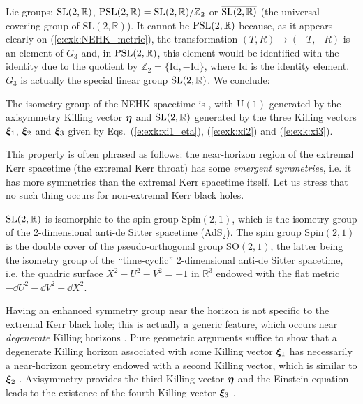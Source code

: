 Lie groups: $\mathrm{SL}(2,\mathbb{R})$, $\mathrm{PSL}(2,\mathbb{R}) = \mathrm{SL}(2,\mathbb{R})/\mathbb{Z}_2$
or $\overline{\mathrm{SL}(2,\mathbb{R})}$
(the universal covering group of $\mathrm{SL}(2, \mathbb{R})$).
It cannot be $\mathrm{PSL}(2,\mathbb{R})$ because, as it appears clearly on (\ref{e:exk:NEHK_metric}),
the transformation $(T,R) \mapsto (-T,-R)$ is an element of $G_3$ and, in $\mathrm{PSL}(2,\mathbb{R})$, this element would be identified with the identity
due to the quotient by $\mathbb{Z}_2 = \{\mathrm{Id}, -\mathrm{Id}\}$, where $\mathrm{Id}$
is the identity element.
$G_3$ is actually the
special linear group $\mathrm{SL}(2,\mathbb{R})$. We conclude:
\begin{prop}
The isometry group
of the NEHK spacetime is
\be \label{e:exk:NHEK_isometry_group}
     ,
\ee
with $\mathrm{U}(1)$ generated by the axisymmetry Killing vector $\bm{\eta}$ and
$\mathrm{SL}(2,\mathbb{R})$ generated by the three Killing vectors $\bm{\xi}_1$, $\bm{\xi}_2$ and
$\bm{\xi}_3$ given by Eqs.~(\ref{e:exk:xi1_eta}), (\ref{e:exk:xi2}) and (\ref{e:exk:xi3}).
\end{prop}

This property is often phrased as follows: the near-horizon region of the extremal
Kerr spacetime (the extremal Kerr throat) has some \emph{emergent symmetries}, i.e. it has
more symmetries than the extremal Kerr spacetime itself.
Let us stress that no such thing occurs for non-extremal Kerr black holes.

\begin{remark}
$\mathrm{SL}(2,\mathbb{R})$ is isomorphic to the spin group $\mathrm{Spin}(2,1)$,
which is the isometry group of the 2-dimensional anti-de Sitter spacetime (AdS$_2$).
The spin group $\mathrm{Spin}(2,1)$ is the double cover of the pseudo-orthogonal group $\mathrm{SO}(2,1)$, the latter being the isometry group of the ``time-cyclic'' 2-dimensional
anti-de Sitter spacetime, i.e. the quadric surface $X^2 - U^2 - V^2 = -1$ in
$\mathbb{R}^3$ endowed with the flat metric $-\dd U^2 - \dd V^2 + \dd X^2$.
\end{remark}

\begin{remark}
Having an enhanced symmetry group near the horizon is not specific to the
extremal Kerr black hole;
this is actually a generic feature, which occurs near \emph{degenerate} Killing horizons
\cite{KunduL13,Compe17}.
Pure geometric arguments suffice to show that a degenerate Killing horizon
associated with some Killing vector $\bm{\xi}_1$ has necessarily a near-horizon geometry
endowed with a second Killing vector, which is similar to $\bm{\xi}_2$ \cite{KunduL13}.
Axisymmetry provides the third Killing vector $\bm{\eta}$ and the Einstein equation
leads to the existence of the fourth Killing vector $\bm{\xi}_3$
\cite{KunduLR07}.
\end{remark}

